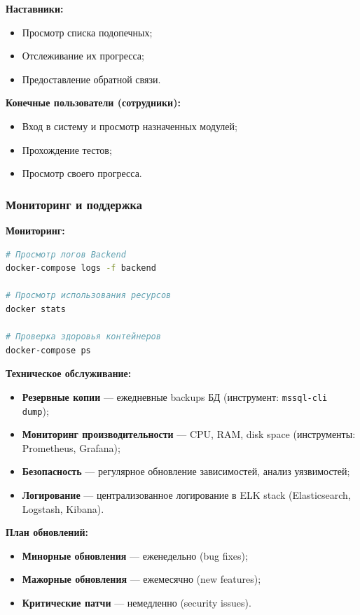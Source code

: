 \textbf{Наставники:}
\begin{itemize}
    \item Просмотр списка подопечных;
    \item Отслеживание их прогресса;
    \item Предоставление обратной связи.
\end{itemize}

\textbf{Конечные пользователи (сотрудники):}
\begin{itemize}
    \item Вход в систему и просмотр назначенных модулей;
    \item Прохождение тестов;
    \item Просмотр своего прогресса.
\end{itemize}

\subsubsection{Мониторинг и поддержка}

\textbf{Мониторинг:}
\begin{lstlisting}[language=bash, basicstyle=\ttfamily\small]
# Просмотр логов Backend
docker-compose logs -f backend

# Просмотр использования ресурсов
docker stats

# Проверка здоровья контейнеров
docker-compose ps
\end{lstlisting}

\textbf{Техническое обслуживание:}

\begin{itemize}
    \item \textbf{Резервные копии} --- ежедневные backups БД (инструмент: \texttt{mssql-cli dump});
    \item \textbf{Мониторинг производительности} --- CPU, RAM, disk space (инструменты: Prometheus, Grafana);
    \item \textbf{Безопасность} --- регулярное обновление зависимостей, анализ уязвимостей;
    \item \textbf{Логирование} --- централизованное логирование в ELK stack (Elasticsearch, Logstash, Kibana).
\end{itemize}

\textbf{План обновлений:}

\begin{itemize}
    \item \textbf{Минорные обновления} --- еженедельно (bug fixes);
    \item \textbf{Мажорные обновления} --- ежемесячно (new features);
    \item \textbf{Критические патчи} --- немедленно (security issues).
\end{itemize}
